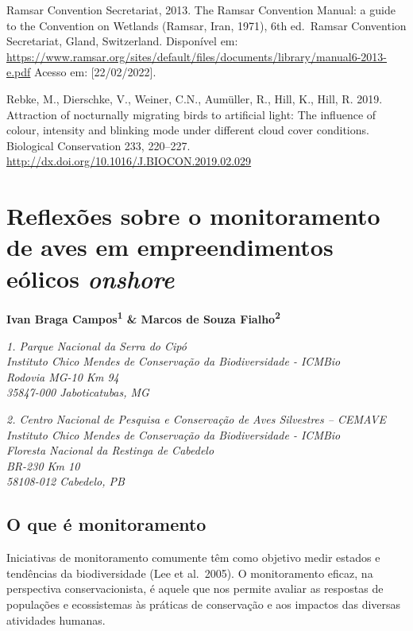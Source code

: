 \documentclass[
  oneside]{scrbook}
\begin{document}
Ramsar Convention Secretariat, 2013. The Ramsar Convention Manual: a guide to the Convention on Wetlands (Ramsar, Iran, 1971), 6th ed.~Ramsar Convention Secretariat, Gland, Switzerland. Disponível em: \url{https://www.ramsar.org/sites/default/files/documents/library/manual6-2013-e.pdf} Acesso em: {[}22/02/2022{]}.

Rebke, M., Dierschke, V., Weiner, C.N., Aumüller, R., Hill, K., Hill, R. 2019. Attraction of nocturnally migrating birds to artificial light: The influence of colour, intensity and blinking mode under different cloud cover conditions. Biological Conservation 233, 220--227. \url{http://dx.doi.org/10.1016/J.BIOCON.2019.02.029}

\hypertarget{cap6}{%
\chapter{\texorpdfstring{Reflexões sobre o monitoramento de aves em empreendimentos eólicos \emph{onshore}}{Reflexões sobre o monitoramento de aves em empreendimentos eólicos onshore}}\label{cap6}}

\pagestyle{headings}

\textbf{Ivan Braga Campos\textsuperscript{1} \& Marcos de Souza Fialho\textsuperscript{2}}

\emph{1. Parque Nacional da Serra do Cipó}\\
\emph{Instituto Chico Mendes de Conservação da Biodiversidade - ICMBio}\\
\emph{Rodovia MG-10 Km 94}\\
\emph{35847-000 Jaboticatubas, MG}

\emph{2. Centro Nacional de Pesquisa e Conservação de Aves Silvestres -- CEMAVE}\\
\emph{Instituto Chico Mendes de Conservação da Biodiversidade - ICMBio}\\
\emph{Floresta Nacional da Restinga de Cabedelo}\\
\emph{BR-230 Km 10}\\
\emph{58108-012 Cabedelo, PB}

\hypertarget{o-que-uxe9-monitoramento}{%
\section{O que é monitoramento}\label{o-que-uxe9-monitoramento}}

Iniciativas de monitoramento comumente têm como objetivo medir estados e tendências da biodiversidade (Lee et al.~2005). O monitoramento eficaz, na perspectiva conservacionista, é aquele que nos permite avaliar as respostas de populações e ecossistemas às práticas de conservação e aos impactos das diversas atividades humanas.
\end{document}
